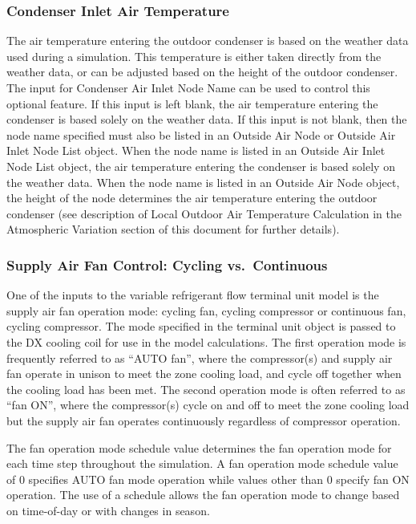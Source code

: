 \subsubsection{Condenser Inlet Air Temperature}\label{condenser-inlet-air-temperature-2}

The air temperature entering the outdoor condenser is based on the weather data used during a simulation. This temperature is either taken directly from the weather data, or can be adjusted based on the height of the outdoor condenser. The input for Condenser Air Inlet Node Name can be used to control this optional feature. If this input is left blank, the air temperature entering the condenser is based solely on the weather data. If this input is not blank, then the node name specified must also be listed in an Outside Air Node or Outside Air Inlet Node List object. When the node name is listed in an Outside Air Inlet Node List object, the air temperature entering the condenser is based solely on the weather data. When the node name is listed in an Outside Air Node object, the height of the node determines the air temperature entering the outdoor condenser (see description of Local Outdoor Air Temperature Calculation in the Atmospheric Variation section of this document for further details).

\subsubsection{Supply Air Fan Control: Cycling vs.~Continuous}\label{supply-air-fan-control-cycling-vs.continuous-2}

One of the inputs to the variable refrigerant flow terminal unit model is the supply air fan operation mode: cycling fan, cycling compressor or continuous fan, cycling compressor. The mode specified in the terminal unit object is passed to the DX cooling coil for use in the model calculations. The first operation mode is frequently referred to as ``AUTO fan'', where the compressor(s) and supply air fan operate in unison to meet the zone cooling load, and cycle off together when the cooling load has been met. The second operation mode is often referred to as ``fan ON'', where the compressor(s) cycle on and off to meet the zone cooling load but the supply air fan operates continuously regardless of compressor operation.

The fan operation mode schedule value determines the fan operation mode for each time step throughout the simulation. A fan operation mode schedule value of 0 specifies AUTO fan mode operation while values other than 0 specify fan ON operation. The use of a schedule allows the fan operation mode to change based on time-of-day or with changes in season.


